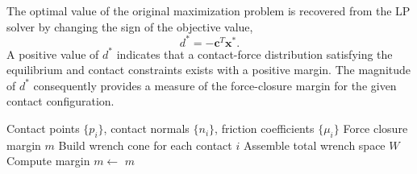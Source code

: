 The optimal value of the original maximization problem is recovered from
the LP solver by changing the sign of the objective value,
\begin{equation}
    d^{*}=-\boldsymbol{c}^{T}\boldsymbol{x}^{*}.
\end{equation}
A positive value of $d^{*}$ indicates that a contact-force distribution
satisfying the equilibrium and contact constraints exists with a positive
margin. The magnitude of $d^{*}$ consequently provides a measure of the
force-closure margin for the given contact configuration.

\begin{algorithm}[H]
\caption{Force closure margin computation (placeholder)}
\begin{algorithmic}[1]
\Require Contact points $\{p_i\}$, contact normals $\{n_i\}$, friction coefficients $\{\mu_i\}$
\Ensure Force closure margin $m$
\State Build wrench cone for each contact $i$
\State Assemble total wrench space $W$
\State Compute margin $m \gets$ 
\State \Return $m$
\end{algorithmic}
\end{algorithm}
